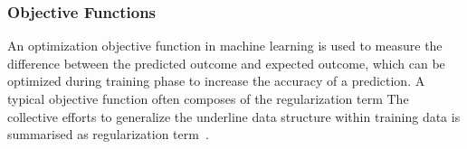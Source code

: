 \subsubsection{Objective Functions}
An optimization objective function in machine learning is used to measure the difference between the predicted outcome and expected outcome, which can be optimized during training phase to increase the accuracy of a prediction. A typical objective function often composes of the regularization term The collective efforts to generalize the underline data structure within training data is summarised as regularization term~\cite{goodfellow_2015}.  